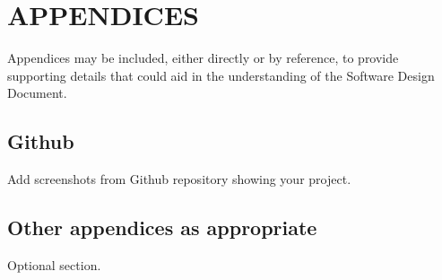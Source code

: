 \documentclass[12pt]{article}
\begin{document}
\section{APPENDICES}
Appendices may be included, either directly or by reference, to provide supporting details that could aid in the understanding of the Software Design Document.
\subsection{Github}
Add screenshots from Github repository showing your project.

\subsection{ Other appendices as appropriate}
Optional section.

\printbibliography
\end{document}
